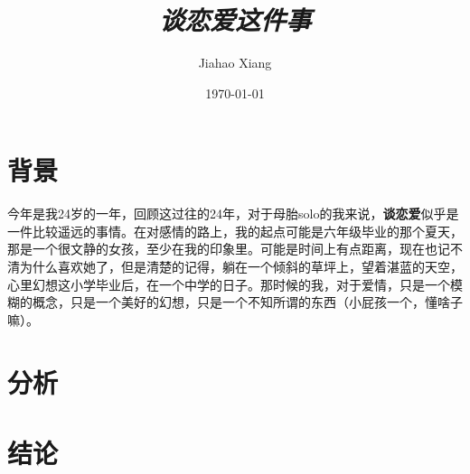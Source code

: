 \documentclass{article}
\title{\textit{谈恋爱这件事}}
\author{Jiahao Xiang}
\date{\today}
\begin{document}
\maketitle

\section{背景}
今年是我24岁的一年，回顾这过往的24年，对于母胎solo的我来说，\textbf{谈恋爱}似乎是一件比较遥远的事情。在对感情的路上，我的起点可能是六年级毕业的那个夏天，那是一个很文静的女孩，至少在我的印象里。可能是时间上有点距离，现在也记不清为什么喜欢她了，但是清楚的记得，躺在一个倾斜的草坪上，望着湛蓝的天空，心里幻想这小学毕业后，在一个中学的日子。那时候的我，对于爱情，只是一个模糊的概念，只是一个美好的幻想，只是一个不知所谓的东西（小屁孩一个，懂啥子嘛）。



\section{分析}


\section{结论}
\end{document}
